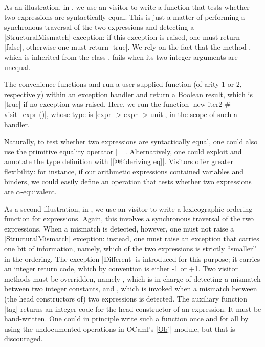 \documentclass[11pt,a4paper,twoside]{article}
\begin{document}
As an illustration, in , we use an \itertwo visitor to write
a function that tests whether two expressions are syntactically equal. This is
just a matter of performing a synchronous traversal of the two expressions and
detecting a \oc|StructuralMismatch| exception: if this exception is raised,
one must return \oc|false|, otherwise one must return \oc|true|. We rely on
the fact that the method , which is inherited from the class
, fails when its two integer arguments are
unequal.

The convenience functions  and
 run a user-supplied function (of arity 1 or 2,
respectively) within an exception handler and return a Boolean result, which
is \oc|true| if no exception was raised. Here, we run the function
%
\oc|new iter2 # visit_expr ()|, whose type is \oc|expr -> expr -> unit|,
in the scope of such a handler.

Naturally, to test whether two expressions are syntactically equal, one could
also use the primitive equality operator \oc|=|. Alternatively, one could
exploit \ppxderiving and annotate the type definition with
%
\oc|[@@deriving eq]|. Visitors offer greater flexibility: for instance, if our
arithmetic expressions contained variables and binders, we could easily define
an operation that tests whether two expressions are $\alpha$-equivalent.

As a second illustration, in , we use an \itertwo
visitor to write a lexicographic ordering function for expressions. Again,
this involves a synchronous traversal of the two expressions. When a mismatch
is detected, however, one must not raise a \oc|StructuralMismatch| exception:
instead, one must raise an exception that carries one bit of information,
namely, which of the two expressions is strictly ``smaller'' in the ordering.
The exception \oc|Different| is introduced for this purpose; it carries an
integer return code, which by convention is either -1 or +1. Two visitor methods
must be overridden, namely , which is in charge of detecting
a mismatch between two integer constants, and , which is invoked
when a mismatch between (the head constructors of) two expressions is detected.
The auxiliary function \oc|tag| returns an integer code for the head constructor
of an expression. It must be hand-written. One could in principle write such a
function once and for all by using the undocumented operations in OCaml's
\href{https://caml.inria.fr/pub/docs/manual-ocaml/libref/Obj.html}{\oc|Obj|}
module, but that is discouraged.
\end{document}
